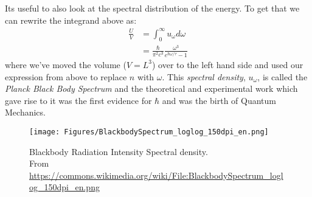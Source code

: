 Its useful to also look at the spectral distribution of the energy. To get that
we can rewrite the integrand above as:
\begin{align}
\frac{U}{V} &= \int_{0}^{\infty} u_{\omega} d\omega \\
	        &= \frac{\hbar}{\pi^2 c^3} \frac{\omega^3}{e^{\hbar \omega/\tau} - 1}
\end{align}
where we've moved the volume ($V = L^3$) over to the left hand side and used
our expression from above to replace $n$ with $\omega$. This
\textit{spectral density}, $u_{\omega}$, is called the
\emph{Planck Black Body Spectrum} and the theoretical and experimental work which
gave rise to it was the first evidence for $\hbar$ and was the birth of
Quantum Mechanics.

\begin{figure}[ht]
\centering
\texttt{[image: Figures/BlackbodySpectrum\_loglog\_150dpi\_en.png]}
\caption{Blackbody Radiation Intensity Spectral density. \\
	From \url{https://commons.wikimedia.org/wiki/File:BlackbodySpectrum_loglog_150dpi_en.png}}
\end{figure}

